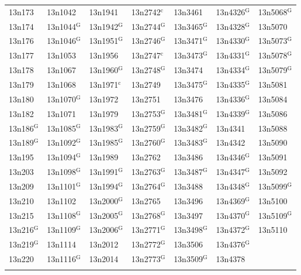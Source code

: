 \documentclass[12pt, oneside]{amsart}
\begin{document}
{\begin{longtable}{*{7}{>{\raggedright\arraybackslash}p{}}}
13n173 & 13n1042 & 13n1941 & 13n2742$^{\mathrm{c}}$ & 13n3461 & 13n4326$^{\mathrm{G}}$ & 13n5068$^{\mathrm{G}}$ \\
13n174 & 13n1044$^{\mathrm{G}}$ & 13n1942$^{\mathrm{G}}$ & 13n2744$^{\mathrm{G}}$ & 13n3465$^{\mathrm{G}}$ & 13n4328$^{\mathrm{G}}$ & 13n5070 \\
13n176 & 13n1046$^{\mathrm{G}}$ & 13n1951$^{\mathrm{G}}$ & 13n2746$^{\mathrm{G}}$ & 13n3471$^{\mathrm{G}}$ & 13n4330$^{\mathrm{G}}$ & 13n5073$^{\mathrm{G}}$ \\
13n177 & 13n1053 & 13n1956 & 13n2747$^{\mathrm{c}}$ & 13n3473$^{\mathrm{G}}$ & 13n4331$^{\mathrm{G}}$ & 13n5078$^{\mathrm{G}}$ \\
13n178 & 13n1067 & 13n1960$^{\mathrm{G}}$ & 13n2748$^{\mathrm{G}}$ & 13n3474 & 13n4334$^{\mathrm{G}}$ & 13n5079$^{\mathrm{G}}$ \\
13n179 & 13n1068 & 13n1971$^{\mathrm{c}}$ & 13n2749 & 13n3475$^{\mathrm{G}}$ & 13n4335$^{\mathrm{G}}$ & 13n5081 \\
13n180 & 13n1070$^{\mathrm{G}}$ & 13n1972 & 13n2751 & 13n3476 & 13n4336$^{\mathrm{G}}$ & 13n5084 \\
13n182 & 13n1071 & 13n1979 & 13n2753$^{\mathrm{G}}$ & 13n3481$^{\mathrm{G}}$ & 13n4339$^{\mathrm{G}}$ & 13n5086 \\
13n186$^{\mathrm{G}}$ & 13n1085$^{\mathrm{G}}$ & 13n1983$^{\mathrm{G}}$ & 13n2759$^{\mathrm{G}}$ & 13n3482$^{\mathrm{G}}$ & 13n4341 & 13n5088 \\
13n189$^{\mathrm{G}}$ & 13n1092$^{\mathrm{G}}$ & 13n1985$^{\mathrm{G}}$ & 13n2760$^{\mathrm{G}}$ & 13n3483$^{\mathrm{G}}$ & 13n4342 & 13n5090 \\
13n195 & 13n1094$^{\mathrm{G}}$ & 13n1989 & 13n2762 & 13n3486 & 13n4346$^{\mathrm{G}}$ & 13n5091 \\
13n203 & 13n1098$^{\mathrm{G}}$ & 13n1991$^{\mathrm{G}}$ & 13n2763$^{\mathrm{G}}$ & 13n3487$^{\mathrm{G}}$ & 13n4347$^{\mathrm{G}}$ & 13n5092 \\
13n209 & 13n1101$^{\mathrm{G}}$ & 13n1994$^{\mathrm{G}}$ & 13n2764$^{\mathrm{G}}$ & 13n3488 & 13n4348$^{\mathrm{G}}$ & 13n5099$^{\mathrm{G}}$ \\
13n210 & 13n1102 & 13n2000$^{\mathrm{G}}$ & 13n2765 & 13n3496 & 13n4369$^{\mathrm{G}}$ & 13n5100 \\
13n215 & 13n1108$^{\mathrm{G}}$ & 13n2005$^{\mathrm{G}}$ & 13n2768$^{\mathrm{G}}$ & 13n3497 & 13n4370$^{\mathrm{G}}$ & 13n5109$^{\mathrm{G}}$ \\
13n216$^{\mathrm{G}}$ & 13n1109$^{\mathrm{G}}$ & 13n2006$^{\mathrm{G}}$ & 13n2771$^{\mathrm{G}}$ & 13n3498$^{\mathrm{G}}$ & 13n4372$^{\mathrm{G}}$ & 13n5110 \\*
13n219$^{\mathrm{G}}$ & 13n1114 & 13n2012 & 13n2772$^{\mathrm{G}}$ & 13n3506 & 13n4376$^{\mathrm{G}}$ &  \\*
13n220 & 13n1116$^{\mathrm{G}}$ & 13n2014 & 13n2773$^{\mathrm{G}}$ & 13n3509$^{\mathrm{G}}$ & 13n4378 &  \\*
\multicolumn{7}{@{}l@{}}{\usebox{\appendixLegendBox}} \\
\end{longtable}}
\end{document}
